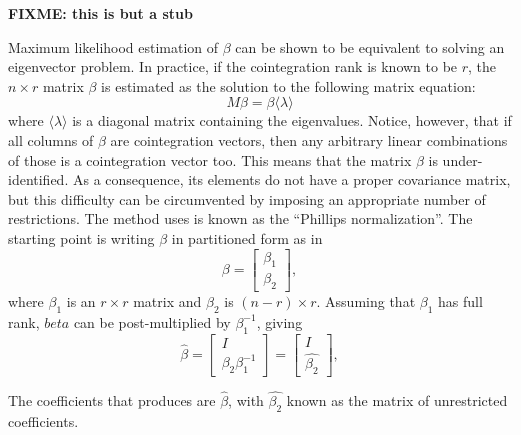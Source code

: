\textbf{FIXME: this is but a stub}

Maximum likelihood estimation of $\beta$ can be shown to be equivalent
to solving an eigenvector problem. In practice, if the cointegration
rank is known to be $r$, the $n \times r$ matrix $\beta$ is estimated
as the solution to the following matrix equation:
\[
  M \beta = \beta \langle \lambda \rangle
\]
where $\langle \lambda \rangle$ is a diagonal matrix containing the
eigenvalues. Notice, however, that if all columns of $\beta$ are
cointegration vectors, then any arbitrary linear combinations of those
is a cointegration vector too. This means that the matrix $\beta$ is
under-identified. As a consequence, its elements do not have a proper
covariance matrix, but this difficulty can be circumvented by imposing
an appropriate number of restrictions. The method  uses is
known as the ``Phillips normalization''. The starting point is writing
$\beta$ in partitioned form as in
\[
  \beta = \left[
    \begin{array}{c} \beta_1 \\ \beta_2  \end{array}
    \right] ,
\]
where $\beta_1$ is an $r \times r$ matrix and  $\beta_2$ is $(n-r)
\times r$. Assuming that $\beta_1$ has full rank, $beta$ can be
post-multiplied by $\beta_1^{-1}$, giving
\[
  \hat{\beta} = \left[
    \begin{array}{c} I \\ \beta_2 \beta_1^{-1}  \end{array}
    \right] =
    \left[
    \begin{array}{c} I \\ \hat{\beta_2} \end{array}
  \right]  ,
\]

The coefficients that  produces are $\hat{\beta}$, with
$\hat{\beta_2}$ known as the matrix of unrestricted coefficients.



